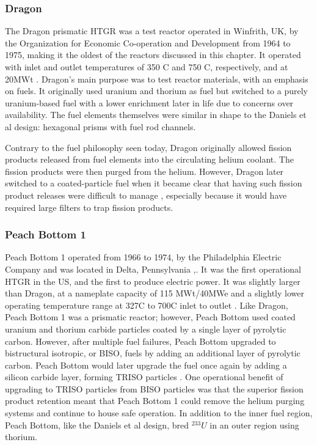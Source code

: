 \subsubsection{Dragon}
\label{dragon}

The Dragon prismatic HTGR was a test reactor operated in Winfrith, UK, by the Organization for Economic Co-operation and Development from 1964 to 1975, making it the oldest of the reactors discussed in this chapter.  It operated with inlet and outlet temperatures of 350 \textdegree C and 750 \textdegree C, respectively, and at 20MWt \cite{beck_high_nodate}.  Dragon's main purpose was to test reactor materials, with an emphasis on fuels.  It originally used uranium and thorium as fuel but switched to a purely uranium-based fuel with a lower enrichment later in life due to concerns over availability.  The fuel elements themselves were similar in shape to the Daniels et al design: hexagonal prisms with fuel rod channels.

Contrary to the fuel philosophy seen today, Dragon originally allowed fission products released from fuel elements into the circulating helium coolant.  The fission products were then purged from the helium.  However, Dragon later switched to a coated-particle fuel when it became clear that having such fission product releases were difficult to manage \cite{simnad_early_1991}, especially because it would have required large filters to trap fission products.

\subsubsection{Peach Bottom 1}
\label{peach}

Peach Bottom 1 operated from 1966 to 1974, by the Philadelphia Electric Company and was located in Delta, Pennsylvania \cite{beck_high_nodate},\cite{noauthor_peach_nodate}.  It was the first operational HTGR in the US, and the first to produce electric power.  It was slightly larger than Dragon, at a nameplate capacity of 115 MWt/40MWe and a slightly lower operating temperature range at 327\textdegree  C to 700\textdegree  C inlet to outlet \cite{beck_high_nodate}.  Like Dragon, Peach Bottom 1 was a prismatic reactor; however, Peach Bottom used coated uranium and thorium carbide particles coated by a single layer of pyrolytic carbon.  However, after multiple fuel failures, Peach Bottom upgraded to bistructural isotropic, or BISO, fuels by adding an additional layer of pyrolytic carbon.  Peach Bottom would later upgrade the fuel once again by adding a silicon carbide layer, forming TRISO particles \cite{beck_high_nodate}.  One operational benefit of upgrading to TRISO particles from BISO particles was that the superior fission product retention meant that Peach Bottom 1 could remove the helium purging systems and continue to house safe operation.  In addition to the inner fuel region, Peach Bottom, like the Daniels et al design, bred $^{233}U$ in an outer region using thorium.

